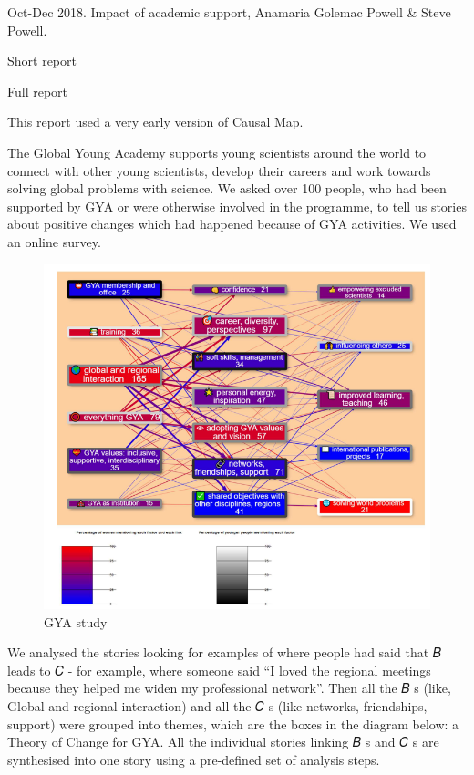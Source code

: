 \documentclass[
]{book}
\begin{document}
Oct-Dec 2018. Impact of academic support, Anamaria Golemac Powell \& Steve Powell.

\href{https://globalyoungacademy.net/wp-content/uploads/2019/04/GYA-Impact-Analysis-2018_Final.pdf}{Short report}

\href{https://globalyoungacademy.net/wp-content/uploads/2019/04/GYA-Impact-Analyisis-2018-Technical-Appendix.pdf}{Full report}

This report used a very early version of Causal Map.

The Global Young Academy supports young scientists around the world to connect with
other young scientists, develop their careers and work towards solving global problems
with science. We asked over 100 people, who had been supported by GYA or were
otherwise involved in the programme, to tell us stories about positive changes which had
happened because of GYA activities. We used an online survey.

\begin{figure}
\centering
\includegraphics{_assets/a5fe43e040d834d29f87af7e2dc8daa9.png}
\caption{GYA study}
\end{figure}

We analysed the stories looking for examples of where people had said that 𝐵 leads to 𝐶 -
for example, where someone said ``I loved the regional meetings because they helped me
widen my professional network''. Then all the 𝐵 s (like, Global and regional interaction) and
all the 𝐶 s (like networks, friendships, support) were grouped into themes, which are the
boxes in the diagram below: a Theory of Change for GYA. All the individual stories linking 𝐵 s and 𝐶 s are synthesised into one story using a pre-defined set of analysis steps.
\end{document}

